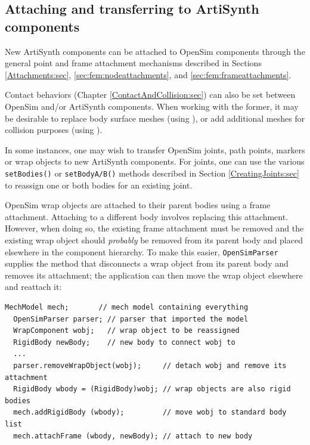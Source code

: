 \subsection{Attaching and transferring to ArtiSynth components}
\label{OpenSimAttaching:sec}

New ArtiSynth components can be attached to OpenSim components through the
general point and frame attachment mechanisms described in Sections
\ref{Attachments:sec}, \ref{sec:fem:nodeattachments}, and
\ref{sec:fem:frameattachments}.

Contact behaviors (Chapter \ref{ContactAndCollision:sec}) can also be set
between OpenSim and/or ArtiSynth components. When working with the former, it
may be desirable to replace body surface meshes
(using ), or add additional
meshes for collision purposes (using ).

In some instances, one may wish to transfer OpenSim joints, path points,
markers or wrap objects to new ArtiSynth components.  For joints, one can use
the various {\tt setBodies()} or {\tt setBodyA/B()} methods described in
Section \ref{CreatingJoints:sec} to reassign one or both bodies for an existing
joint. 

OpenSim wrap objects are attached to their parent bodies using a frame
attachment. Attaching to a different body involves replacing this
attachment. However, when doing so, the existing frame attachment must be
removed and the existing wrap object should {\it probably} be removed from its
parent body and placed elsewhere in the component hierarchy. To make this
easier, {\tt OpenSimParser} supplies the method
 that disconnects a wrap
object from its parent body and removes its attachment; the application can
then move the wrap object elsewhere and reattach it:
%
\begin{lstlisting}[]
  MechModel mech;       // mech model containing everything
  OpenSimParser parser; // parser that imported the model
  WrapComponent wobj;   // wrap object to be reassigned
  RigidBody newBody;    // new body to connect wobj to
  ...
  parser.removeWrapObject(wobj);     // detach wobj and remove its attachment
  RigidBody wbody = (RigidBody)wobj; // wrap objects are also rigid bodies
  mech.addRigidBody (wbody);         // move wobj to standard body list
  mech.attachFrame (wbody, newBody); // attach to new body
\end{lstlisting}
%

